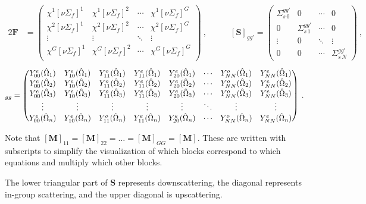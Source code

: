 \documentclass[12pt]{article}
\newcommand{\ve}[1]{\ensuremath{\mathbf{#1}}}
\newcommand{\Macro}{\ensuremath{\Sigma}}
\newcommand{\vOmega}{\ensuremath{\hat{\Omega}}}
\newcommand{\Ye}[2]{\ensuremath{Y^e_{#1}(\vOmega_#2)}}
\newcommand{\Yo}[2]{\ensuremath{Y^o_{#1}(\vOmega_#2)}}
\newcommand{\sigg}[1]{\ensuremath{\Macro^{gg'}_{s\,#1}}}
\begin{document}
 \begin{alignat}{2}
      \mathbf{F}  &=     \begin{pmatrix}
     \chi^{1}[\nu\Macro_{f}]^{1} &\chi^{1}[\nu\Macro_{f}]^{2} & \cdots &
      \chi^{1}[\nu\Macro_{f}]^{G} \\
      \chi^{2}[\nu\Macro_{f}]^{1} &\chi^{2}[\nu\Macro_{f}]^{2} & \cdots &
      \chi^{2}[\nu\Macro_{f}]^{G}\\
      \vdots & \vdots & \ddots & \vdots \\
      \chi^{G}[\nu\Macro_{f}]^{1} &\chi^{G}[\nu\Macro_{f}]^{2} & \cdots &
      \chi^{G}[\nu\Macro_{f}]^{G}\\
    \end{pmatrix} \:, \nonumber & \qquad
  [\ve{S}]_{gg'} = \begin{pmatrix}
    \sigg{0} & 0 & \cdots & 0  \\
    0 & \sigg{1} & \cdots & 0 \\
    \vdots & 0 & \ddots  & \vdots \\
     0 & 0 & \cdots & \sigg{N}
  \end{pmatrix}\:, \nonumber
 \end{alignat}
\begin{equation}    
   [\ve{M}]_{gg} = \begin{pmatrix}
    \Ye{00}{1} & \Ye{10}{1} & \Yo{11}{1} & \Ye{11}{1} & 
    \Ye{20}{1} & \cdots & \Yo{NN}{1} & \Ye{NN}{1} \\
    \Ye{00}{2} & \Ye{10}{2} & \Yo{11}{2} & \Ye{11}{2} & 
    \Ye{20}{2} & \cdots & \Yo{NN}{2} & \Ye{NN}{2} \\
    \Ye{00}{3} & \Ye{10}{3} & \Yo{11}{3} & \Ye{11}{3} & 
    \Ye{20}{3} & \cdots & \Yo{NN}{3} & \Ye{NN}{3} \\
    \vdots     & \vdots     & \vdots     & \vdots     & 
    \vdots     &  \ddots    & \vdots     & \vdots     \\
    \Ye{00}{n} & \Ye{10}{n} & \Yo{11}{n} & \Ye{11}{n} & 
    \Ye{20}{n} & \cdots & \Yo{NN}{n} & \Ye{NN}{n}
  \end{pmatrix}\:. \nonumber \\
\end{equation}

\noindent Note that $[\ve{M}]_{11} = [\ve{M}]_{22} =  \hdots = [\ve{M}]_{GG} = [\ve{M}]$. These are written with subscripts to simplify the visualization of which blocks correspond to which equations and multiply which other blocks.

The lower
triangular part of $\ve{S}$ represents downscattering, the diagonal represents
in-group scattering, and the upper diagonal is upscattering. 
\end{document}
